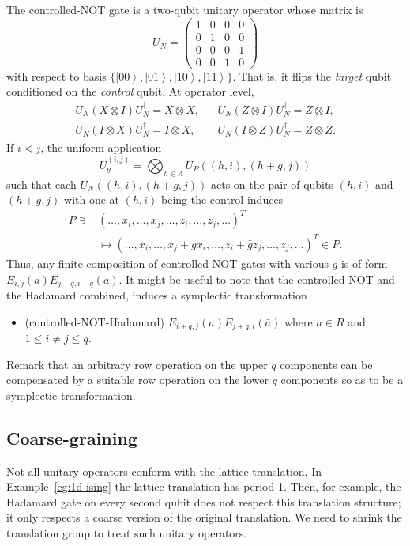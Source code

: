 \documentclass[letterpaper,12pt]{amsart}
\theoremstyle{definition} \newtheorem{defn}{Definition}
\theoremstyle{definition} \newtheorem{rem}{Remark}
\theoremstyle{definition} \newtheorem{example}{Example}
\newcommand{\ket}[1]{\left| {#1} \right\rangle}
\begin{document}
The controlled-NOT gate is a two-qubit unitary operator whose matrix is
\[
U_N =
 \begin{pmatrix}
  1 & 0 & 0 & 0 \\
  0 & 1 & 0 & 0 \\
  0 & 0 & 0 & 1 \\
  0 & 0 & 1 & 0
 \end{pmatrix}
\]
with respect to basis $\{ \ket{00}, \ket{01}, \ket{10}, \ket{11} \}$.
That is, it flips the {\em target} qubit conditioned on the {\em control} qubit.
At operator level,
\begin{align*}
U_N (X \otimes I ) U_N^\dagger = X \otimes X, & &
U_N (Z \otimes I ) U_N^\dagger = Z \otimes I, \\
U_N (I \otimes X ) U_N^\dagger = I \otimes X, & &
U_N (I \otimes Z ) U_N^\dagger = Z \otimes Z.
\end{align*}
If $i < j$, the uniform application
\[
U^{(i,j)}_g = \bigotimes_{h \in \Lambda} U_P( (h,i), (h+g,j) )
\]
such that each $U_N( (h,i), (h+g,j) )$ acts on the pair of qubits $(h,i)$ and $(h+g,j)$
with one at $(h,i)$ being the control
induces
\begin{align*}
P \ni & (\ldots,x_i,\ldots,x_j,\ldots, z_i, \ldots, z_j, \ldots)^T \\
& \mapsto ( \ldots, x_i, \ldots, x_j + g x_i, \ldots, z_i + \bar g z_j, \ldots, z_j, \ldots )^T \in P .
\end{align*}
Thus, any finite composition of controlled-NOT gates with various $g$ is of form $E_{i,j}(a) E_{j+q,i+q}(\bar a)$.
It might be useful to note that the controlled-NOT and the Hadamard combined,
induces a symplectic transformation
\begin{itemize}
\item (controlled-NOT-Hadamard) $E_{i+q,j}(a) E_{j+q,i}(\bar a)$ where $a \in R$ and $ 1 \le i \ne j \le q$.
\end{itemize}

Remark that an arbitrary row operation on the upper $q$ components
can be compensated by a suitable row operation on the lower $q$ components
so as to be a symplectic transformation.


\subsection{Coarse-graining}

Not all unitary operators conform with the lattice translation.
In Example~\ref{eg:1d-ising} the lattice translation has period 1.
Then, for example, the Hadamard gate on every second qubit 
does not respect this translation structure;
it only respects a coarse version of the original translation.
We need to shrink the translation group to treat such unitary operators.
\end{document}
